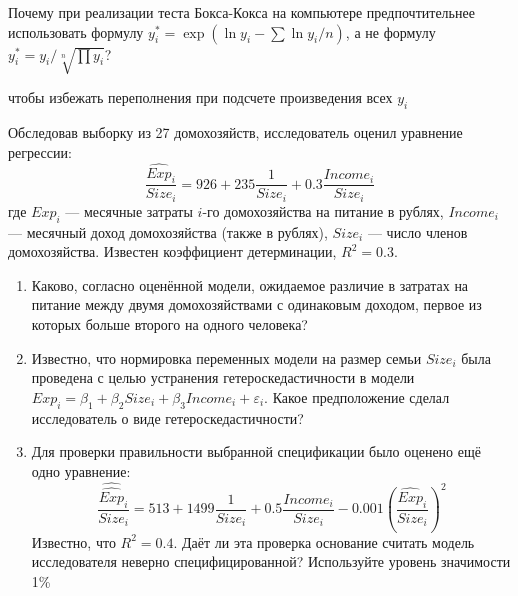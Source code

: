\documentclass[pdftex,11pt,openany]{book}\usepackage[]{graphicx}\usepackage[]{color}
\begin{document}
\begin{solution}
\end{solution}

\begin{problem}
Почему при реализации теста Бокса-Кокса на компьютере предпочтительнее использовать формулу $y^*_i=\exp(\ln y_i - \sum \ln y_i /n) $, а не формулу $y^*_i=y_i/\sqrt[n]{\prod y_i}$?
\end{problem}

\begin{solution}
чтобы избежать переполнения при подсчете произведения всех $y_i$
\end{solution}


\begin{problem}
Обследовав выборку из 27 домохозяйств, исследователь оценил уравнение регрессии:
\[
\frac{\widehat{Exp}_i}{Size_i}=926+235\frac{1}{Size_i}+0.3\frac{Income_i}{Size_i}
\]
где $Exp_i$ --- месячные затраты $i$-го домохозяйства на питание в рублях, $Income_i$ --- месячный доход домохозяйства (также в рублях),  $Size_i$ --- число членов домохозяйства. Известен коэффициент детерминации, $R^2=0.3$.

\begin{enumerate}
\item Каково, согласно оценённой модели, ожидаемое различие в затратах на питание между двумя домохозяйствами с одинаковым доходом, первое из которых больше второго на одного человека?
\item Известно, что нормировка переменных модели на размер семьи $Size_i$ была проведена с целью устранения гетероскедастичности в модели $Exp_i=\beta_1+\beta_2 Size_i+\beta_3 Income_i+\varepsilon_i$. Какое предположение сделал исследователь о виде гетероскедастичности?
\item Для проверки правильности выбранной спецификации было оценено ещё одно уравнение:
\[
\frac{\widehat{\widehat{Exp}}_i}{Size_i}=513+1499\frac{1}{Size_i}+0.5\frac{Income_i}{Size_i}-0.001\left(\frac{\widehat{Exp}_i}{Size_i}\right)^2
\]
Известно, что $R^2=0.4$. Даёт ли эта проверка основание считать модель исследователя неверно специфицированной? Используйте уровень значимости 1\%
\end{enumerate}
\end{problem}

\begin{solution}
\end{solution}
\end{document}
